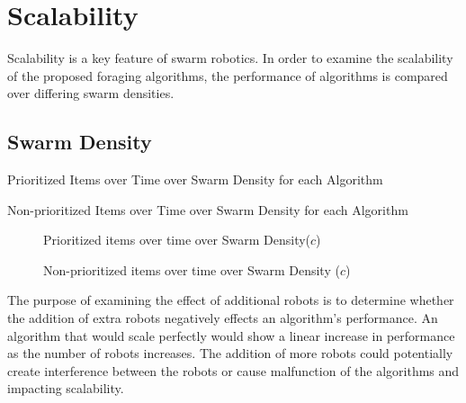 \section{Scalability}
\label{results:scability}
Scalability is a key feature of swarm robotics. In order to examine the scalability of the proposed foraging algorithms, the performance of algorithms is compared over differing swarm densities. 

\subsection{Swarm Density}
\label{results:numberenvironments}

\begin{table} [h]
     \caption{Prioritized Items over Time over Swarm Density for each Algorithm}
     \label{specializationprioritized}
	\centering
	\footnotesize
	
\end{table}

\begin{table} [h]
     \caption{Non-prioritized Items over Time over Swarm Density for each Algorithm}
     \label{specializationnonprioritized}
	\centering
	\footnotesize
	
\end{table}


\begin{figure}[!htb]
\centering
\resizebox{\textwidth}{!}{}
\caption{Prioritized items over time over Swarm Density($c$)}
\label{robotsgoldplot}
\end{figure}

\begin{figure}[!htb]
\centering
\resizebox{\textwidth}{!}{}
\caption{Non-prioritized items over time over Swarm Density ($c$)}
\label{robotswasteplot}
\end{figure}

The purpose of examining the effect of additional robots is to determine whether the addition of extra robots negatively effects an algorithm's performance. An algorithm that would scale perfectly would show a linear increase in performance as the number of robots increases. The addition of more robots could potentially create interference between the robots or cause malfunction of the algorithms and impacting scalability. 


